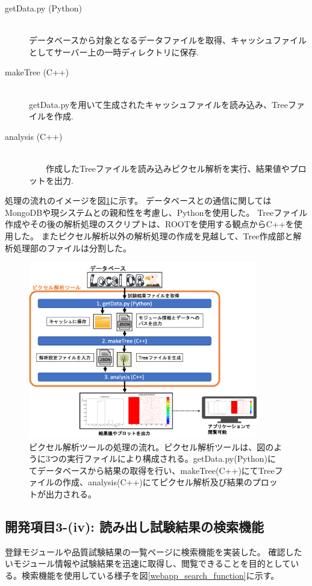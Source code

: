 \begin{description}
  \item[getData.py (Python)]\mbox{}\\ 
    データベースから対象となるデータファイルを取得、キャッシュファイルとしてサーバー上の一時ディレクトリに保存.
  \item[makeTree (C++)]\mbox{}\\ 
    getData.pyを用いて生成されたキャッシュファイルを読み込み、Treeファイルを作成.
  \item[analysis (C++)]\mbox{}\\ 
　　作成したTreeファイルを読み込みピクセル解析を実行、結果値やプロットを出力.
\end{description}

処理の流れのイメージを図\ref{analysis_tool_flow}に示す。
データベースとの通信に関してはMongoDBや現システムとの親和性を考慮し、Pythonを使用した。
Treeファイル作成やその後の解析処理のスクリプトは、ROOTを使用する観点からC++を使用した。
またピクセル解析以外の解析処理の作成を見越して、Tree作成部と解析処理部のファイルは分割した。

\begin{figure}[bpt]\centering
\includegraphics[width=10cm]{./analysis_tool_flow.png}
\caption[ピクセル解析ツールの処理の流れ]{ピクセル解析ツールの処理の流れ。ピクセル解析ツールは、図のように3つの実行ファイルにより構成される。getData.py(Python)にてデータベースから結果の取得を行い、makeTree(C++)にてTreeファイルの作成、analysis(C++)にてピクセル解析及び結果のプロットが出力される。}
\label{analysis_tool_flow}
\end{figure}

\clearpage
\subsection{開発項目3-(iv): 読み出し試験結果の検索機能}\label{sec:searching_tool}
登録モジュールや品質試験結果の一覧ページに検索機能を実装した。
確認したいモジュール情報や試験結果を迅速に取得し、閲覧できることを目的としている。検索機能を使用している様子を図\ref{webapp_search_function}に示す。

